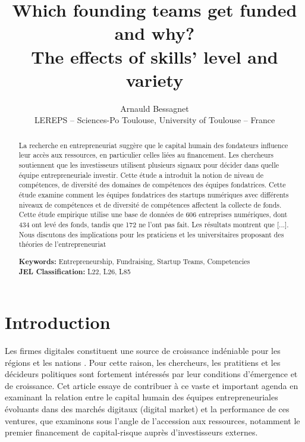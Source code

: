 \documentclass[12pt]{article}
\begin{document}
\title{Which founding teams get funded and why? \\ The effects of skills' level and variety}
\date{\vspace{-3ex}}
\author{Arnauld Bessagnet \\ \footnotesize{LEREPS – Sciences-Po Toulouse, University of Toulouse – France} \\}

\maketitle \vspace{-1,5em}

\begin{abstract}
\noindent
La recherche en entrepreneuriat suggère que le capital humain des fondateurs influence leur accès aux ressources, en particulier celles liées au financement. Les chercheurs soutiennent que les investisseurs utilisent plusieurs signaux pour décider dans quelle équipe entrepreneuriale investir. Cette étude a introduit la notion de niveau de compétences, de diversité des domaines de compétences des équipes fondatrices. Cette étude examine comment les équipes fondatrices des startups numériques avec différents niveaux de compétences et de diversité de compétences affectent la collecte de fonds. Cette étude empirique utilise une base de données de 606 entreprises numériques, dont 434 ont levé des fonds, tandis que 172 ne l'ont pas fait. Les résultats montrent que [...]. Nous discutons des implications pour les praticiens et les universitaires proposant des théories de l'entrepreneuriat \newline

\begin{obeylines}
\noindent \footnotesize{}{\textbf{Keywords:} Entrepreneurship, Fundraising, Startup Teams, Competencies}
\noindent \footnotesize{\textbf{JEL Classification:} L22, L26, L85}
\end{obeylines}

\end{abstract}

\clearpage
\section{Introduction}

Les firmes digitales constituent une source de croissance indéniable pour les régions et les nations \citep{acs2021evolution}. Pour cette raison, les chercheurs, les pratitiens et les décideurs politiques sont fortement intéressés par leur conditions d'émergence et de croissance. Cet article essaye de contribuer à ce vaste et important agenda en examinant la relation entre le capital humain des équipes entrepreneuriales évoluants dans des marchés digitaux (digital market) et la performance de ces ventures, que examinons sous l'angle de l'accession aux ressources, notamment le premier financement de capital-risque auprès d'investisseurs externes.
\end{document}
